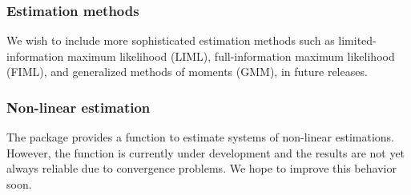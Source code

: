 \subsubsection*{Estimation methods}
We wish to include more sophisticated estimation methods such
as limited-information maximum likelihood (LIML),
full-information maximum likelihood (FIML),
and generalized methods of moments (GMM), in future releases.

\subsubsection*{Non-linear estimation}
The  package provides a function to estimate
systems of non-linear estimations.
However, the function  is currently under development
and the results are not yet always reliable
due to convergence problems.
We hope to improve this behavior soon.





